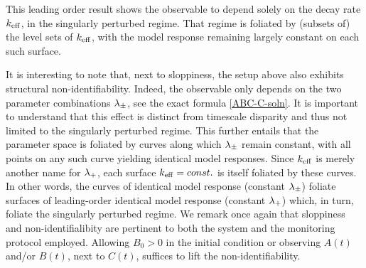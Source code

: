 This leading order result shows the observable to depend solely on the
decay rate $k_\mathrm{eff}$, in the singularly perturbed regime.  That regime
is foliated by (subsets of) the level sets of $k_\mathrm{eff}$,
with the model response remaining largely constant on each such surface.

It is interesting to note that, next to sloppiness, the setup above
also exhibits structural non-identifiability.  Indeed, the
observable only depends on the two parameter combinations $\lambda_\pm$, see
the exact formula \eqref{ABC-C-soln}.  It is important to understand
that this effect is distinct from timescale disparity and thus not
limited to the singularly perturbed regime.  This further entails that
the parameter space is foliated by curves along which $\lambda_\pm$ remain
constant, with all points on any such curve yielding identical
model responses.  Since $k_\mathrm{eff}$ is merely another name for $\lambda_+$, each
surface $k_\mathrm{eff} = const.$ is itself foliated by these curves.  In other
words, the curves of identical model response (constant $\lambda_\pm$)
foliate surfaces of leading-order identical model response
(constant $\lambda_+$) which, in turn, foliate the singularly perturbed
regime.  We remark once again that sloppiness and non-identifialibity
are pertinent to both the system and the monitoring protocol employed.
Allowing $B_0>0$ in the initial condition or observing $A(t)$ and/or
$B(t)$, next to $C(t)$, suffices to lift the non-identifiability.\\